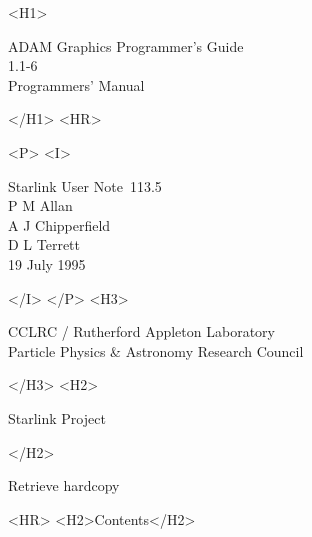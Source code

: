 \documentclass[twoside,11pt]{article}
\newcommand{\stardoccategory}  {Starlink User Note}
\newcommand{\stardocsource}    {sun\stardocnumber}
\newcommand{\stardocnumber}    {113.5}
\newcommand{\stardocauthors}   {P M Allan\\A J Chipperfield\\D L Terrett}
\newcommand{\stardocdate}      {19 July 1995}
\newcommand{\stardoctitle}     {ADAM Graphics Programmer's Guide}
\newcommand{\stardocversion}   {1.1-6}
\newcommand{\stardocmanual}    {Programmers' Manual}
\newcommand{\htmladdnormallink}[2]{#1}
\newcommand{\htmladdimg}[1]{}
\newcommand{\htmlref}[2]{#1}
\newcommand{\htmladdtonavigation}[1]{}
\newcommand{\xlabel}[1]{}
\renewcommand{\_}{\texttt{\symbol{95}}}
\begin{document}
\begin{htmlonly}
   \xlabel{}
   \begin{rawhtml} <H1> \end{rawhtml}
      \stardoctitle\\
      \stardocversion\\
      \stardocmanual
   \begin{rawhtml} </H1> <HR> \end{rawhtml}


   \begin{rawhtml} <P> <I> \end{rawhtml}
   \stardoccategory\ \stardocnumber \\
   \stardocauthors \\
   \stardocdate
   \begin{rawhtml} </I> </P> <H3> \end{rawhtml}
      \htmladdnormallink{CCLRC / Rutherford Appleton Laboratory}
                        {http://www.cclrc.ac.uk} \\
      \htmladdnormallink{Particle Physics \& Astronomy Research Council}
                        {http://www.pparc.ac.uk} \\
   \begin{rawhtml} </H3> <H2> \end{rawhtml}
      \htmladdnormallink{Starlink Project}{http://www.starlink.ac.uk/}
   \begin{rawhtml} </H2> \end{rawhtml}
   \htmladdnormallink{\htmladdimg{source.gif} Retrieve hardcopy}
      {http://www.starlink.ac.uk/cgi-bin/hcserver?\stardocsource}\\

  \label{stardoccontents}
  \begin{rawhtml}
    <HR>
    <H2>Contents</H2>
  \end{rawhtml}
  \htmladdtonavigation{\htmlref{\htmladdimg{contents_motif.gif}}
        {stardoccontents}}

\end{htmlonly}
\end{document}
